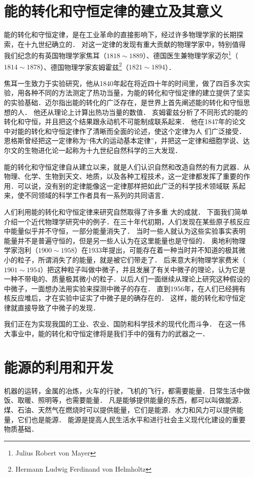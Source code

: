 \section{能的转化和守恒定律的建立及其意义}
能的转化和守恒定律，是在工业革命的直接影响下，经过许多物理学家的长期探索，在十九世纪确立的．
对这一定律的发现有重大贡献的物理学家中，特别值得我们纪念的有英国物理学家焦耳（$1818 \sim 1889$）、德国医生兼物理学家迈尔\footnote{Julius Robert von Mayer}（$1814 \sim 1878$）、德国物理学家亥姆霍兹\footnote{Hermann Ludwig Ferdinand von Helmholtz}（$1821 \sim 1894$）．

焦耳一生致力于实验研究，他从1840年起在将近四十年的时间里，做了四百多次实验，用各种不同的方法测定了热功当量，为能的转化和守恒定律的建立提供了坚实的实验基础．迈尔指出能的转化的广泛存在，是世界上首先阐述能的转化和守恒思想的人．
他还从理论上计算出热功当量的数值．
亥姆霍兹分析了不同形式的能的转化和守恒，并且把这个结果跟永动机不可能制成联系起来．
他在1847年的论文中对能的转化和守恒定律作了清晰而全面的论述，使这个定律为人
们广泛接受．恩格斯曾经把这一定律称为“伟大的运动基本定律”，并把这一定律和细胞学说、达尔文的生物进化论一起称为十九世纪自然科学的三大发现．

能的转化和守恒定律自从建立以来，就是人们认识自然和改造自然的有力武器．从物理、化学、生物到天文、地质，以及各种工程技术，这一定律都发挥了重要的作用．可以说，没有别的定律能像这一定律那样把如此广泛的科学技术领域联
系起来，使不同领域的科学工作者具有一系列的共同语言．

人们利用能的转化和守恒定律来研究自然取得了许多重
大的成就．
下面我们简单介绍一个近代物理学研究中的例子．在三十年代初期，人们发现在某些原子核反应中能量似乎并不守恒，一部分能量消失了．
当时一些人就认为这些实验事实表明能量并不是普遍守恒的，但是另一些人认为在这里能量也是守恒的．
奥地利物理学家泡利（$1900 \sim 1958$）在1933年提出，可能存在着一种当时并不知道的极其微小的粒子，所谓消失了的能量，就是被它们带走了．
后来意大利物理学家费米（$1901 \sim 1954$）把这种粒子叫做中微子，并且发展了有关中微子的理论，认为它是一种不带电的、质量极其微小的粒子．以后人们一面继续从理论上研究这种假设的中微子，一面想办法用实验来探测中微子的存在．
直到1956年，在人们已经拥有核反应堆后，才在实验中证实了中微子是的确存在的．
这样，能的转化和守恒定律就直接导致了中微子的发现．

我们正在为实现我国的工业、农业、国防和科学技术的现代化而斗争．
在这一伟大事业中，能的转化和守恒定律将是我们手中的强有力的武器之一．

\section{能源的利用和开发}
机器的运转，金属的冶炼，火车的行驶，飞机的飞行，都需要能量．日常生活中做饭、取暖、照明等，也需要能量．
凡是能够提供能量的东西，都可以叫做能源．煤、石油、天然气在燃烧时可以提供能量，它们是能源．水力和风力可以提供能
量，它们也是能源．
能源是提高人民生活水平和进行社会主义现代化建设的重要物质基础．

